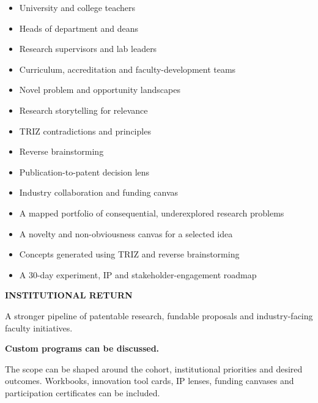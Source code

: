 \begin{minipage}[t]{0.36\textwidth}
  \vspace{0pt}
  \begin{brochurecard}[colback=Accent!5!white]
    \begin{itemize}
      \item University and college teachers
      \item Heads of department and deans
      \item Research supervisors and lab leaders
      \item Curriculum, accreditation and faculty-development teams
    \end{itemize}
  \end{brochurecard}

  \begin{brochurecard}
    \begin{itemize}
      \item Novel problem and opportunity landscapes
      \item Research storytelling for relevance
      \item TRIZ contradictions and principles
      \item Reverse brainstorming
      \item Publication-to-patent decision lens
      \item Industry collaboration and funding canvas
    \end{itemize}
  \end{brochurecard}

  \begin{brochurecard}[colback=Accent!3!white]
    \begin{itemize}
      \item A mapped portfolio of consequential, underexplored research problems
      \item A novelty and non-obviousness canvas for a selected idea
      \item Concepts generated using TRIZ and reverse brainstorming
      \item A 30-day experiment, IP and stakeholder-engagement roadmap
    \end{itemize}
    {\color{Accent}\bfseries\fontsize{6.6}{7.2}\selectfont INSTITUTIONAL RETURN}\par
    A stronger pipeline of patentable research, fundable proposals and industry-facing faculty initiatives.
  \end{brochurecard}

  \begin{customprogramcard}
    {\bfseries Custom programs can be discussed.}\par
    The scope can be shaped around the cohort, institutional priorities and desired outcomes.
    Workbooks, innovation tool cards, IP lenses, funding canvases and participation certificates can be included.
  \end{customprogramcard}
\end{minipage}

\Footer
